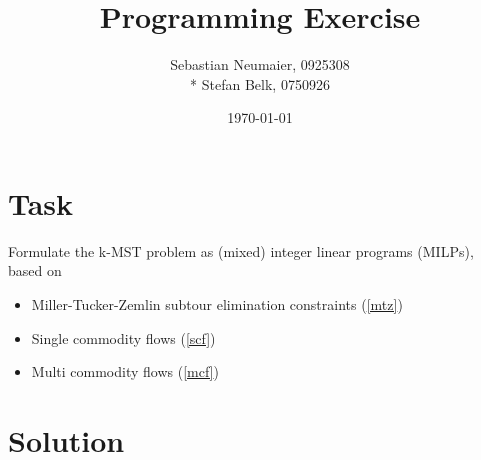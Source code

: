 \documentclass{article}
\title{Programming Exercise}
\author{Sebastian Neumaier, 0925308 \\* Stefan Belk, 0750926}
\date{\today}
\begin{document}
\maketitle

\section{Task}

Formulate the k-MST problem as (mixed) integer linear programs (MILPs), based on
\begin{itemize}
\item Miller-Tucker-Zemlin subtour elimination constraints (\ref{mtz})
\item Single commodity flows (\ref{scf})
\item Multi commodity flows (\ref{mcf})
\end{itemize}
\section{Solution}
\end{document}
